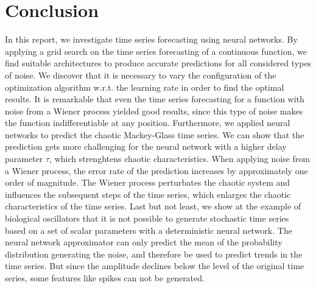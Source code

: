 
\section{Conclusion}

In this report, we investigate time series forecasting using neural networks.
By applying a grid search on the time series forecasting of a continuous 
function, we find suitable architectures to produce accurate predictions for 
all considered types of noise. We discover that it is necessary to vary the 
configuration of the optimization algorithm w.r.t. the learning rate in order 
to find the optimal results. It is remarkable that even the time series 
forecasting for a function with noise from a Wiener process yielded good 
results, since this type of noise makes the function indifferentiable at any 
position. Furthermore, we applied neural networks to predict the chaotic 
Mackey-Glass time series. We can show that the prediction gets more challenging
for the neural network with a higher delay parameter $\tau$, which strenghtens
chaotic characteristics. When applying noise from a Wiener process, the error
rate of the prediction increases by approximately one order of magnitude. The
Wiener process perturbates the chaotic system and influences the subsequent
steps of the time series, which enlarges the chaotic characteristics of the 
time series. Last but not least, we show at the example of biological
oscillators that it is not possible to generate stochastic time series based on
a set of scalar parameters with a deterministic neural network. The neural
network approximator can only predict the mean of the probability distribution
generating the noise, and therefore be used to predict trends in the time 
series. But since the amplitude declines below the level of the original time 
series, some features like spikes can not be generated.
